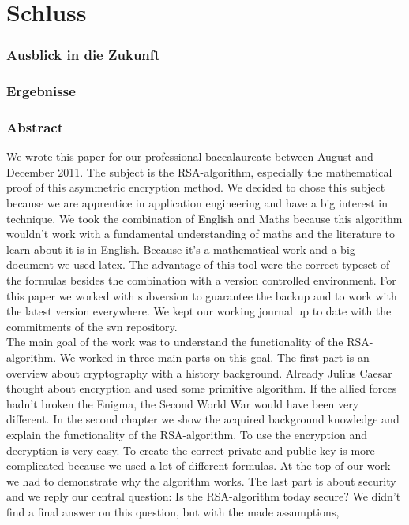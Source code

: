\part{Schluss}
\section{Ausblick in die Zukunft}
\section{Ergebnisse}
\section{Abstract}
We wrote this paper for our professional baccalaureate between August and December 2011. The subject is the RSA-algorithm, especially the mathematical proof of this asymmetric encryption method. We decided to chose this subject because we are apprentice in application engineering and have a big interest in technique. We took the combination of English and Maths because this algorithm wouldn't work with a fundamental understanding of maths and the literature to learn about it is in English. Because it's a mathematical work and a big document we used latex. The advantage of this tool were the correct typeset of the formulas besides the combination with a version controlled environment. For this paper we worked with subversion to guarantee the backup and to work with the latest version everywhere. We kept our working journal up to date with the commitments of the svn repository.  \\
The main goal of the work was to understand the functionality of the RSA-algorithm. We worked in three main parts on this goal. The first part is an overview about cryptography with a history background. Already Julius Caesar thought about encryption and used some primitive algorithm. If the allied forces hadn't broken the Enigma, the Second World War would have been very different. %
In the second chapter we show the acquired background knowledge and explain the functionality of the RSA-algorithm. To use the encryption and decryption is very easy. To create the correct private and public key is more complicated because we used a lot of different formulas. At the top of our work we had to demonstrate why the algorithm works. 
The last part is about security and we reply our central question: Is the RSA-algorithm today secure? We didn't find a final answer on this question, but with the made assumptions, %
